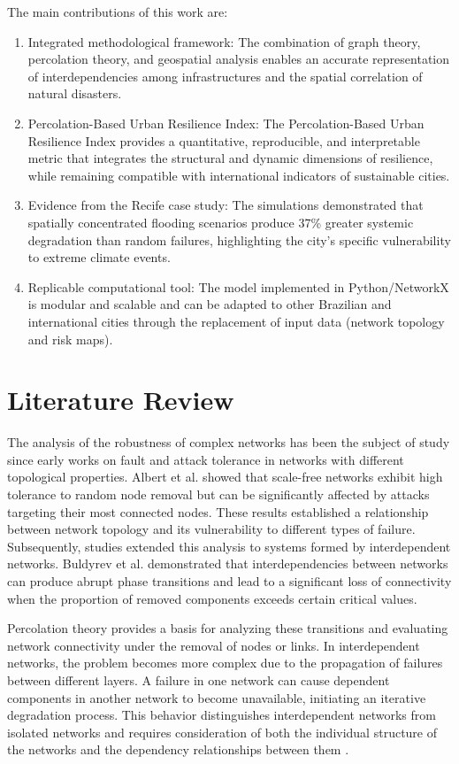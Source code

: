 \documentclass[journal]{IEEEtran}
\begin{document}
The main contributions of this work are:

\begin{enumerate}
\item Integrated methodological framework: The combination of graph theory, percolation theory, and geospatial analysis enables an accurate representation of interdependencies among infrastructures and the spatial correlation of natural disasters.
\item Percolation-Based Urban Resilience Index: The Percolation-Based Urban Resilience Index provides a quantitative, reproducible, and interpretable metric that integrates the structural and dynamic dimensions of resilience, while remaining compatible with international indicators of sustainable cities.
\item Evidence from the Recife case study: The simulations demonstrated that spatially concentrated flooding scenarios produce 37\% greater systemic degradation than random failures, highlighting the city's specific vulnerability to extreme climate events.
\item Replicable computational tool: The model implemented in Python/NetworkX is modular and scalable and can be adapted to other Brazilian and international cities through the replacement of input data (network topology and risk maps).
\end{enumerate}

\section{Literature Review}

The analysis of the robustness of complex networks has been the subject of study since early works on fault and attack tolerance in networks with different topological properties. Albert et al. \cite{albert2000} showed that scale-free networks exhibit high tolerance to random node removal but can be significantly affected by attacks targeting their most connected nodes. These results established a relationship between network topology and its vulnerability to different types of failure. Subsequently, studies extended this analysis to systems formed by interdependent networks. Buldyrev et al. \cite{buldyrev2010} demonstrated that interdependencies between networks can produce abrupt phase transitions and lead to a significant loss of connectivity when the proportion of removed components exceeds certain critical values.

Percolation theory provides a basis for analyzing these transitions and evaluating network connectivity under the removal of nodes or links. In interdependent networks, the problem becomes more complex due to the propagation of failures between different layers. A failure in one network can cause dependent components in another network to become unavailable, initiating an iterative degradation process. This behavior distinguishes interdependent networks from isolated networks and requires consideration of both the individual structure of the networks and the dependency relationships between them \cite{buldyrev2010}.
\end{document}
